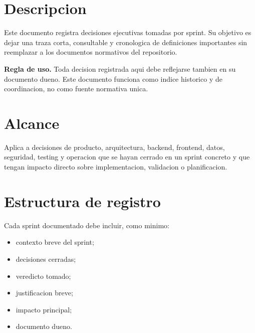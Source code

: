 \def\doctitle{12 Decisiones por Sprint}
\def\docarea{12\_Decisiones\_por\_Sprint}
\def\docversion{0.1.0}
\def\docstatus{Borrador operativo}




\tableofcontents
\clearpage

\section{Descripcion}

Este documento registra decisiones ejecutivas tomadas por sprint. Su objetivo es dejar una traza corta, consultable y cronologica de definiciones importantes sin reemplazar a los documentos normativos del repositorio.

\begin{docnote}
\textbf{Regla de uso.} Toda decision registrada aqui debe reflejarse tambien en su documento dueno. Este documento funciona como indice historico y de coordinacion, no como fuente normativa unica.
\end{docnote}

\section{Alcance}

Aplica a decisiones de producto, arquitectura, backend, frontend, datos, seguridad, testing y operacion que se hayan cerrado en un sprint concreto y que tengan impacto directo sobre implementacion, validacion o planificacion.

\section{Estructura de registro}

Cada sprint documentado debe incluir, como minimo:

\begin{itemize}
  \item contexto breve del sprint;
  \item decisiones cerradas;
  \item veredicto tomado;
  \item justificacion breve;
  \item impacto principal;
  \item documento dueno.
\end{itemize}




